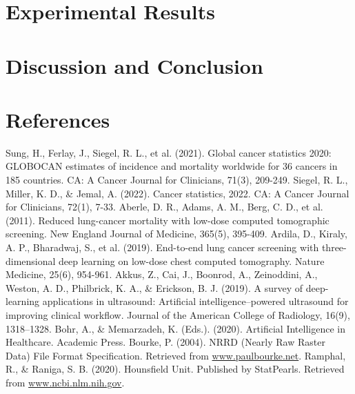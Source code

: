 \documentclass[a4paper, twocolumn, 11pt]{article}
\begin{document}
\section{Experimental Results}
\vspace{7pt}

\section{Discussion and Conclusion}
\vspace{7pt}

\section{References}
\noindent [1] Sung, H., Ferlay, J., Siegel, R. L., et al. (2021). Global cancer statistics 2020: GLOBOCAN estimates of incidence and mortality worldwide for 36 cancers in 185 countries. CA: A Cancer Journal for Clinicians, 71(3), 209-249. \newline
[2] Siegel, R. L., Miller, K. D., \& Jemal, A. (2022). Cancer statistics, 2022. CA: A Cancer Journal for Clinicians, 72(1), 7-33. \newline
[3] Aberle, D. R., Adams, A. M., Berg, C. D., et al. (2011). Reduced lung-cancer mortality with low-dose computed tomographic screening. New England Journal of Medicine, 365(5), 395-409. \newline
[4] Ardila, D., Kiraly, A. P., Bharadwaj, S., et al. (2019). End-to-end lung cancer screening with three-dimensional deep learning on low-dose chest computed tomography. Nature Medicine, 25(6), 954-961. \newline
[5] Akkus, Z., Cai, J., Boonrod, A., Zeinoddini, A., Weston, A. D., Philbrick, K. A., \& Erickson, B. J. (2019). A survey of deep-learning applications in ultrasound: Artificial intelligence–powered ultrasound for improving clinical workflow. Journal of the American College of Radiology, 16(9), 1318–1328. \newline
[6] Bohr, A., \& Memarzadeh, K. (Eds.). (2020). Artificial Intelligence in Healthcare. Academic Press. \newline
[7] Bourke, P. (2004). NRRD (Nearly Raw Raster Data) File Format Specification. Retrieved from \href{https://paulbourke.net/dataformats/nrrd/}{www.paulbourke.net}. \newline
[8] Ramphal, R., \& Raniga, S. B. (2020). Hounsfield Unit. Published by StatPearls. Retrieved from \href{https://www.ncbi.nlm.nih.gov/books/NBK547721/}{www.ncbi.nlm.nih.gov}. \newline
\end{document}
